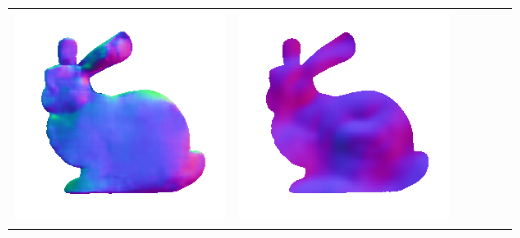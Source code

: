\begin{center}
\begin{tabularx}{\linewidth}{@{}Y@{}Y@{}Y@{}Y@{}Y@{}Y@{}}
\includegraphics[width=\linewidth]{semisynthetic/20160617_14_marrnet_out.png} &
\includegraphics[width=\linewidth]{semisynthetic/20160617_14_ef_out.png} \\

\end{tabularx}
\end{center}
